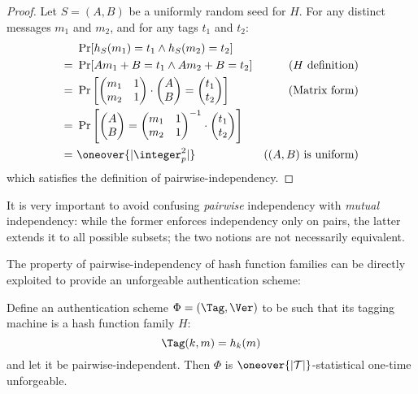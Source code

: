 \begin{proof}
    Let $S = (A, B)$ be a uniformly random seed for $H$. For any distinct messages $m_1$ and $m_2$, and for any tags $t_1$ and $t_2$:
    \begin{align*}
        &\ \Pr[h_S(m_1) = t_1 \wedge h_S(m_2) = t_2]        & \\
        =&\ \Pr[A m_1 + B = t_1 \wedge A m_2 + B = t_2]     & \text{($H$ definition)}\\
        =&\ \Pr\left[ \begin{pmatrix} m_1 & 1 \\ m_2 & 1 \end{pmatrix} \cdot \begin{pmatrix} A \\ B \end{pmatrix} = \begin{pmatrix} t_1 \\ t_2 \end{pmatrix} \right]                                        & \text{(Matrix form)} \\
        =&\ \Pr\left[ \begin{pmatrix} A \\ B \end{pmatrix} = \begin{pmatrix} m_1 & 1 \\ m_2 & 1 \end{pmatrix}^{-1} \cdot \begin{pmatrix} t_1 \\ t_2 \end{pmatrix} \right]                                           & \\
        =&\ \oneover{|\integer_p^2|} & \text{($(A, B)$ is uniform)}
    \end{align*}
    which satisfies the definition of pairwise-independency.
\end{proof}

It is very important to avoid confusing \emph{pairwise} independency with \emph{mutual} independency: while the former enforces independency only on pairs, the latter extends it to all possible subsets; the two notions are not necessarily equivalent.

The property of pairwise-independency of hash function families can be directly exploited to provide an unforgeable authentication scheme:

\begin{theorem}
    Define an authentication scheme $\Phi = (\Tag, \Ver)$ to be such that its tagging machine is a hash function family $H$:
    \[
        \Tag(k, m) = h_k(m)
    \]
    and let it be pairwise-independent. Then $\Phi$ is $\oneover{|\T|}$-statistical one-time unforgeable. 
\end{theorem}

